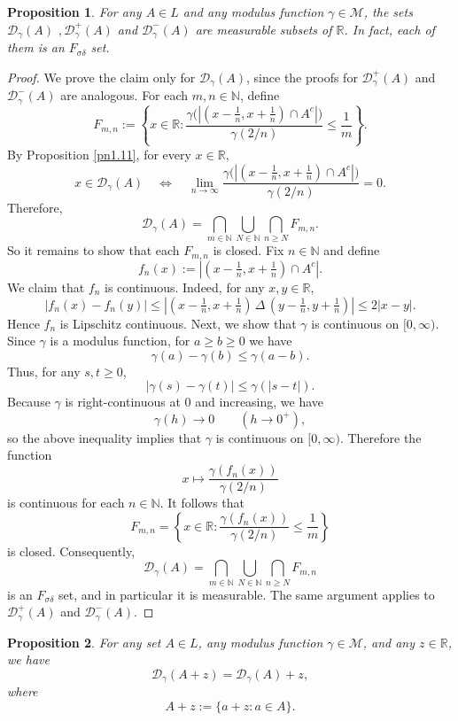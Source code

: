 \documentclass{amsart}
\theoremstyle{plain}
\newtheorem{proposition}{Proposition}
\numberwithin{equation}{section}
\begin{document}
\begin{proposition}
For any $A \in L$ and any modulus function $\gamma \in \mathcal{M}$, the sets
$\mathcal{D}_\gamma(A)$ $, \mathcal{D}_\gamma^+(A)$ and  $\mathcal{D}_\gamma^-(A)$
are measurable subsets of $\mathbb{R}$. In fact, each of them is an $F_{\sigma\delta}$ set.
\end{proposition}
\begin{proof}
We prove the claim only for $\mathcal{D}_\gamma(A)$, since the proofs for $\mathcal{D}_\gamma^+(A)$ and $\mathcal{D}_\gamma^-(A)$ are analogous.
For each $m,n \in \mathbb{N}$, define
$$ F_{m,n} := \left\{ x \in \mathbb{R} : \frac{\gamma\bigl(|(x-\frac1n,x+\frac1n)\cap A^c|\bigr)}{\gamma(2/n)} \le \frac1m \right\}. $$
By Proposition \ref{pn1.11}, for every $x \in \mathbb{R}$,
$$ x \in \mathcal{D}_\gamma(A) \quad\Longleftrightarrow\quad \lim_{n\to\infty}
\frac{\gamma\bigl(|(x-\frac1n,x+\frac1n)\cap A^c|\bigr)}{\gamma(2/n)} =0. $$
Therefore, $$\mathcal{D}_\gamma(A) = \bigcap_{m\in\mathbb{N}} \bigcup_{N\in\mathbb{N}} \bigcap_{n\ge N} F_{m,n}. $$
So it remains to show that each $F_{m,n}$ is closed.
Fix $n\in\mathbb{N}$ and define $$ f_n(x) :=
\left|(x-\tfrac1n,x+\tfrac1n)\cap A^c\right|. $$ We claim that $f_n$ is continuous. Indeed, for any $x,y\in\mathbb{R}$, $$ |f_n(x)-f_n(y)| \le \left| (x-\tfrac1n,x+\tfrac1n)\,\Delta\,(y-\tfrac1n,y+\tfrac1n) \right| \le 2|x-y|. $$
Hence $f_n$ is Lipschitz continuous.
Next, we show that $\gamma$ is continuous on $[0,\infty)$. Since $\gamma$ is a modulus function, for $a\ge b\ge0$ we have $$ \gamma(a)-\gamma(b)\le \gamma(a-b). $$
Thus, for any $s,t\ge0$, $$ |\gamma(s)-\gamma(t)| \le \gamma(|s-t|). $$
Because $\gamma$ is right-continuous at $0$ and increasing, we have $$ \gamma(h)\to 0 \qquad (h\to 0^+), $$
so the above inequality implies that $\gamma$ is continuous on $[0,\infty)$.
Therefore the function
$$ x \mapsto \frac{\gamma(f_n(x))}{\gamma(2/n)} $$
is continuous for each $n\in\mathbb{N}$. It follows that $$ F_{m,n} = \left\{ x \in \mathbb{R} :
\frac{\gamma(f_n(x))}{\gamma(2/n)} \le \frac1m \right\} $$ is closed.
Consequently,
$$ \mathcal{D}_\gamma(A) = \bigcap_{m\in\mathbb{N}} \bigcup_{N\in\mathbb{N}} \bigcap_{n\ge N} F_{m,n} $$
is an $F_{\sigma\delta}$ set, and in particular it is measurable.
The same argument applies to $\mathcal{D}_\gamma^+(A)$ and $\mathcal{D}_\gamma^-(A)$.
\end{proof}
\begin{proposition}\label{m13}
For any set $A \in L$, any modulus function $\gamma \in \mathcal{M}$, and any $z \in \mathbb{R}$, we have
$$\mathcal{D}_\gamma(A+z)=\mathcal{D}_\gamma(A)+z,$$
where$$ A+z:=\{a+z:a\in A\}. $$
\end{proposition}
\end{document}

